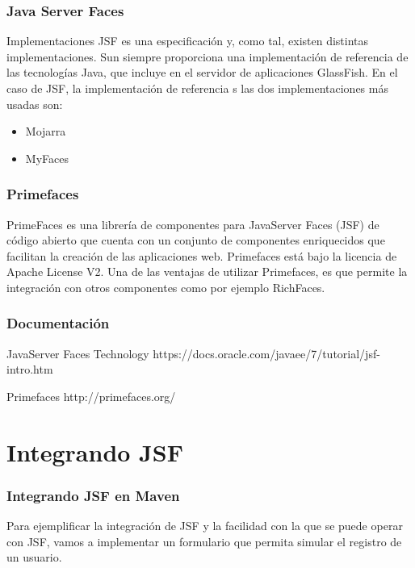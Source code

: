 \documentclass{beamer}
\begin{document}
\begin{frame}[fragile]
  \frametitle{Java Server Faces}

  \begin{block}{Implementaciones}
    JSF es una especificación y, como tal, existen distintas
    implementaciones. Sun siempre proporciona una implementación de
    referencia de las tecnologías Java, que incluye en el servidor de
    aplicaciones GlassFish. En el caso de JSF, la implementación de
    referencia \emph{}s las dos implementaciones más usadas son:

    \begin{itemize}
    \item Mojarra
    \item MyFaces
    \end{itemize}
  \end{block}

\end{frame}

\begin{frame}
  \frametitle{Primefaces}
   PrimeFaces es una librería de componentes para JavaServer Faces
   (JSF) de código abierto que cuenta con un conjunto de componentes
   enriquecidos que facilitan la creación de las aplicaciones
   web. Primefaces está bajo la licencia de Apache License V2. Una de las
   ventajas de utilizar Primefaces, es que permite la integración con
   otros componentes como por ejemplo RichFaces.
\end{frame}

\begin{frame}[fragile]
  \frametitle{Documentación}
  \begin{block}{JavaServer Faces Technology}
    https://docs.oracle.com/javaee/7/tutorial/jsf-intro.htm
  \end{block}

  \begin{block}{Primefaces}
    http://primefaces.org/
  \end{block}
\end{frame}

\section{Integrando JSF}

\begin{frame}
  \frametitle{Integrando JSF en Maven}
  Para ejemplificar la integración de JSF y la facilidad con la que se
  puede operar con JSF, vamos a implementar un formulario que permita
  simular el registro de un usuario.
\end{frame}
\end{document}
